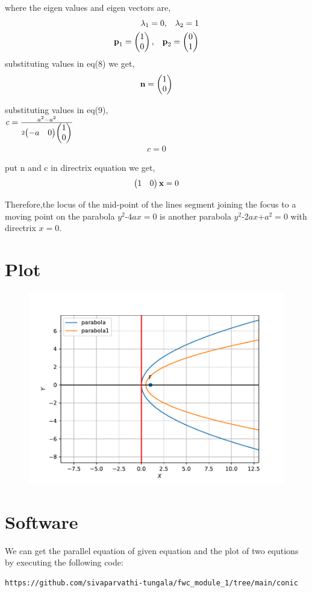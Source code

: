 where the eigen values and eigen vectors are,\\
\begin{align}
\lambda_1=0 ,\hspace{0.3cm} \lambda_2=1\\
\textbf{p}_{1}=\begin{pmatrix}1\\0\end{pmatrix},\hspace{0.3cm} \textbf{p}_{2}=\begin{pmatrix}0\\1\end{pmatrix} 
\end{align}
substituting values in eq(8) we get,\\
\centering
\begin{align}
\textbf{n}=\begin{pmatrix}1\\0\end{pmatrix}
\end{align}
\raggedright
substituting values in eq(9),\\
\centering
\vspace{2mm}
$c=\frac{a^2-a^2}{2\begin{pmatrix}-a & 0\end{pmatrix}\begin{pmatrix}1\\0\end{pmatrix}}$\\
\begin{align}
c=0
\end{align}
\raggedright
put n and c in directrix equation we get,
\centering
\begin{align}
\begin{pmatrix}1&0\end{pmatrix}\textbf{x}=0
\end{align}
\raggedright
        Therefore,the locus of the mid-point of the lines segment joining the focus to a moving point on the parabola $y^2$-$4ax=0$ is another parabola $y^2$-$2ax$+$a^2=0$ with directrix $x=0$.\\
   \section{Plot}
\begin{figure}
       \centering
\includegraphics[width=\columnwidth]{cofig.pdf}
       \label{fig:my_label}
\end{figure}
\section{Software}
\raggedright
  We can get the parallel equation of given equation and the plot of two equtions by executing the following code:
 \vspace{1mm} 
\begin{lstlisting}
https://github.com/sivaparvathi-tungala/fwc_module_1/tree/main/conic
\end{lstlisting}
\